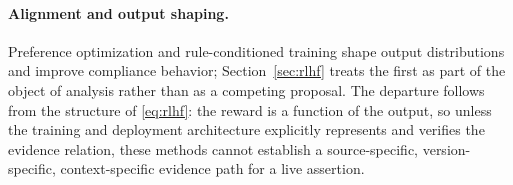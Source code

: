 \paragraph{Alignment and output shaping.} Preference optimization
\citep{ouyang2022} and rule-conditioned training \citep{bai2022} shape output
distributions and improve compliance behavior; Section~\ref{sec:rlhf} treats the
first as part of the object of analysis rather than as a competing proposal. The
departure follows from the structure of \eqref{eq:rlhf}: the reward is a function of
the output, so unless the training and deployment architecture explicitly represents
and verifies the evidence relation, these methods cannot establish a source-specific,
version-specific, context-specific evidence path for a live assertion.
